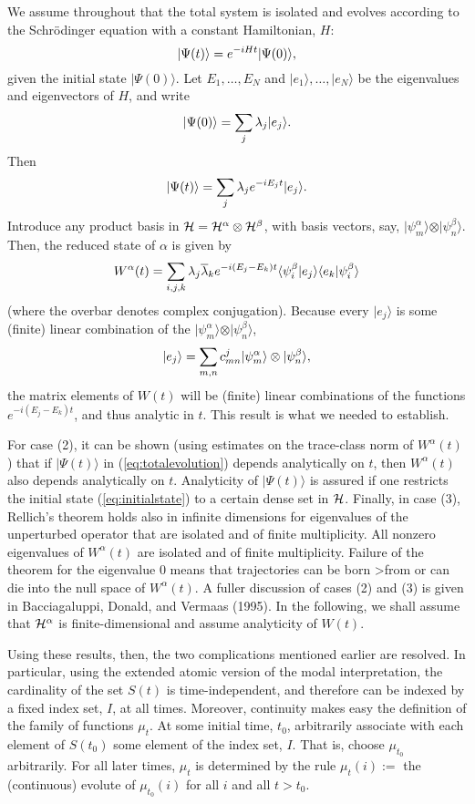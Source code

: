 \documentclass[12pt]{article}
\newcommand{\be}{\vspace*{6pt} \begin{equation}}
\newcommand{\ee}{\vspace*{10pt} \end{equation}}
\newcommand{\cH}{\cal{H}}                                       %
\newcommand{\ga}{\alpha}                                        %
\newcommand{\gb}{\beta}                                         %
\newcommand{\ket}[1]{\vert #1\rangle}                           %
\newcommand{\braket}[2]{\langle #1\vert #2\rangle}              %
\begin{document}
We assume throughout that the total system is isolated and evolves
according to the Schr\"odinger equation with a constant Hamiltonian,
$H$:
\be
\label{eq:totalevolution}
\ket{\Psi(t)}=e^{-iHt}\ket{\Psi(0)},
\ee
given the initial state $\ket{\Psi(0)}$.  Let $E_1,\ldots,E_N$ and
$\ket{e_1},\ldots,\ket{e_N}$ be the eigenvalues and eigenvectors of
$H$, and write
\be
\label{eq:initialstate}
\ket{\Psi(0)}=\sum_j\lambda_j\ket{e_j}.
\ee
\noindent Then
\be
\ket{\Psi(t)}=\sum_j\lambda_j e^{-iE_jt}\ket{e_j}.
\ee
Introduce any product basis in $\cH = \cH^\ga \otimes \cH^\gb$, with
basis vectors, say, $\ket{\psi^\ga_m}\otimes\ket{\psi^\gb_n}$.  Then,
the reduced state of $\ga$ is given by
\be
W^\ga(t) = \sum_{i,j,k}\lambda_j\overline{\lambda}_k e^{-i(E_j-E_k)t}
\braket{\psi^\gb_i}{e_j}\braket{e_k}{\psi^\gb_i}
\ee
(where the overbar denotes complex conjugation).
Because every $\ket{e_j}$ is some (finite) linear combination
of the $\ket{\psi^\ga_m} \otimes \ket{\psi^\gb_n}$,
\be
\ket{e_j} = \sum_{m,n} c^j_{mn} \ket{\psi^\ga_m} \otimes \ket{\psi^\gb_n},
\ee
\noindent the matrix elements of $W(t)$ will be (finite) linear
combinations of the functions $e^{-i(E_j-E_k)t}$, and thus analytic in
$t$.  This result is what we needed to establish.

For case (2), it can be shown (using estimates on the trace-class norm
of $W^\ga(t)$) that if $\ket{\Psi(t)}$ in (\ref{eq:totalevolution})
depends analytically on $t$, then $W^\ga(t)$ also depends analytically
on $t$.  Analyticity of $\ket{\Psi(t)}$ is assured if one restricts the
initial state (\ref{eq:initialstate}) to a certain dense set in $\cH$.
Finally, in case (3), Rellich's theorem holds also in infinite
dimensions for eigenvalues of the unperturbed operator that are
isolated and of finite multiplicity.  All nonzero eigenvalues of
$W^\ga(t)$ are isolated and of finite multiplicity.  Failure of the
theorem for the eigenvalue $0$ means that trajectories can be born
>from or can die into the null space of $W^\ga(t)$.  A fuller
discussion of cases (2) and (3) is given in Bacciagaluppi, Donald,
and Vermaas (1995).  In the following, we shall assume that $\cH^\ga$ is
finite-dimensional and assume analyticity of $W(t)$.

Using these results, then, the two complications
mentioned earlier are resolved.  In particular, using the extended atomic
version of the modal interpretation, the cardinality of the set $S(t)$
is time-independent, and therefore can be indexed by a fixed index
set, $I$, at all times.  Moreover, continuity makes easy the
definition of the family of functions $\mu_{t}$.  At some initial
time, $t_{0}$, arbitrarily associate with each element of $S(t_{0})$
some element of the index set, $I$.  That is, choose $\mu_{t_{0}}$
arbitrarily.  For all later times, $\mu_{t}$ is determined by the
rule $\mu_t(i) := $ the (continuous) evolute of $\mu_{t_0}(i)$ for
all $i$ and all $t>t_0$.
\end{document}
